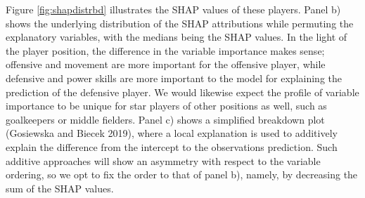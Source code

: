 \documentclass[
]{article}
\begin{document}
Figure \ref{fig:shapdistrbd} illustrates the SHAP values of these players. Panel b) shows the underlying distribution of the SHAP attributions while permuting the explanatory variables, with the medians being the SHAP values. In the light of the player position, the difference in the variable importance makes sense; offensive and movement are more important for the offensive player, while defensive and power skills are more important to the model for explaining the prediction of the defensive player. We would likewise expect the profile of variable importance to be unique for star players of other positions as well, such as goalkeepers or middle fielders. Panel c) shows a simplified breakdown plot (Gosiewska and Biecek 2019), where a local explanation is used to additively explain the difference from the intercept to the observations prediction. Such additive approaches will show an asymmetry with respect to the variable ordering, so we opt to fix the order to that of panel b), namely, by decreasing the sum of the SHAP values.
\end{document}
